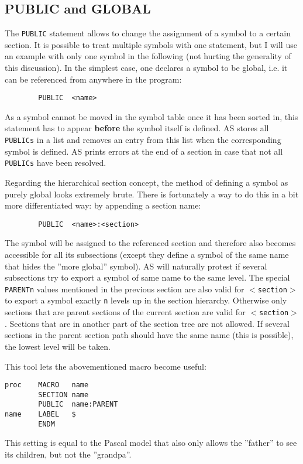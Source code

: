 \documentclass[12pt,twoside]{report}
\makeatletter
\newcommand{\bb}[1]{{\bf #1}}
\newcommand{\tty}[1]{{\tt #1}}
\newcommand{\ttindex}[1]{\index{#1@{\tt #1}}}
\makeatother
\begin{document}

\subsection{PUBLIC and GLOBAL}
\ttindex{PUBLIC}\ttindex{GLOBAL}

The \tty{PUBLIC} statement allows to change the assignment of a symbol to
a certain section.  It is possible to treat multiple symbols with one
statement, but I will use an example with only one symbol in the following
(not hurting the generality of this discussion).  In the simplest case,
one declares a symbol to be global, i.e. it can be referenced from
anywhere in the program:
\begin{verbatim}
        PUBLIC  <name>
\end{verbatim}
As a symbol cannot be moved in the symbol table once it has been sorted
in, this statement has to appear \bb{before} the symbol itself is
defined.  AS stores all \tty{PUBLICs} in a list and removes an entry from
this list when the corresponding symbol is defined.  AS prints errors at
the end of a section in case that not all \tty{PUBLICs} have been
resolved.

Regarding the hierarchical section concept, the method of defining a
symbol as purely global looks extremely brute.  There is fortunately
a way to do this in a bit more differentiated way: by appending a
section name:
\begin{verbatim}
        PUBLIC  <name>:<section>
\end{verbatim}
The symbol will be assigned to the referenced section and therefore also
becomes accessible for all its subsections (except they define a symbol of
the same name that hides the ''more global'' symbol).  AS will naturally
protest if several subsections try to export a symbol of same name to the
same level.  The special \tty{PARENTn} values mentioned in the previous
section are also valid for \tty{$<$section$>$} to export a symbol exactly
\tty{n} levels up in the section hierarchy.  Otherwise only sections that
are parent sections of the current section are valid for
\tty{$<$section$>$}.  Sections that are in another part of the section
tree are not allowed.  If several sections in the parent section path
should have the same name (this is possible), the lowest level will be
taken.

This tool lets the abovementioned macro become useful:
\begin{verbatim}
proc    MACRO   name
        SECTION name
        PUBLIC  name:PARENT
name    LABEL   $
        ENDM
\end{verbatim}
This setting is equal to the Pascal model that also only allows the
''father'' to see its children, but not the ''grandpa''.
\end{document}
